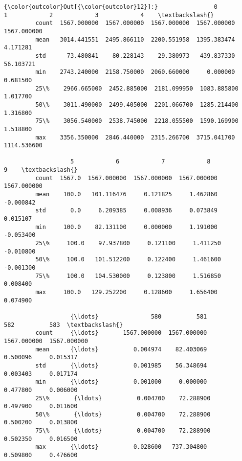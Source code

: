 \documentclass[11pt]{article}
\begin{document}
\begin{Verbatim}[commandchars=\\\{\}]
{\color{outcolor}Out[{\color{outcolor}12}]:}                0            1            2            3            4    \textbackslash{}
         count  1567.000000  1567.000000  1567.000000  1567.000000  1567.000000   
         mean   3014.441551  2495.866110  2200.551958  1395.383474     4.171281   
         std      73.480841    80.228143    29.380973   439.837330    56.103721   
         min    2743.240000  2158.750000  2060.660000     0.000000     0.681500   
         25\%    2966.665000  2452.885000  2181.099950  1083.885800     1.017700   
         50\%    3011.490000  2499.405000  2201.066700  1285.214400     1.316800   
         75\%    3056.540000  2538.745000  2218.055500  1590.169900     1.518800   
         max    3356.350000  2846.440000  2315.266700  3715.041700  1114.536600   
         
                   5            6            7            8            9    \textbackslash{}
         count  1567.0  1567.000000  1567.000000  1567.000000  1567.000000   
         mean    100.0   101.116476     0.121825     1.462860    -0.000842   
         std       0.0     6.209385     0.008936     0.073849     0.015107   
         min     100.0    82.131100     0.000000     1.191000    -0.053400   
         25\%     100.0    97.937800     0.121100     1.411250    -0.010800   
         50\%     100.0   101.512200     0.122400     1.461600    -0.001300   
         75\%     100.0   104.530000     0.123800     1.516850     0.008400   
         max     100.0   129.252200     0.128600     1.656400     0.074900   
         
                   {\ldots}               580          581          582          583  \textbackslash{}
         count     {\ldots}       1567.000000  1567.000000  1567.000000  1567.000000   
         mean      {\ldots}          0.004974    82.403069     0.500096     0.015317   
         std       {\ldots}          0.001985    56.348694     0.003403     0.017174   
         min       {\ldots}          0.001000     0.000000     0.477800     0.006000   
         25\%       {\ldots}          0.004700    72.288900     0.497900     0.011600   
         50\%       {\ldots}          0.004700    72.288900     0.500200     0.013800   
         75\%       {\ldots}          0.004700    72.288900     0.502350     0.016500   
         max       {\ldots}          0.028600   737.304800     0.509800     0.476600   
         

\end{Verbatim}
\end{document}
